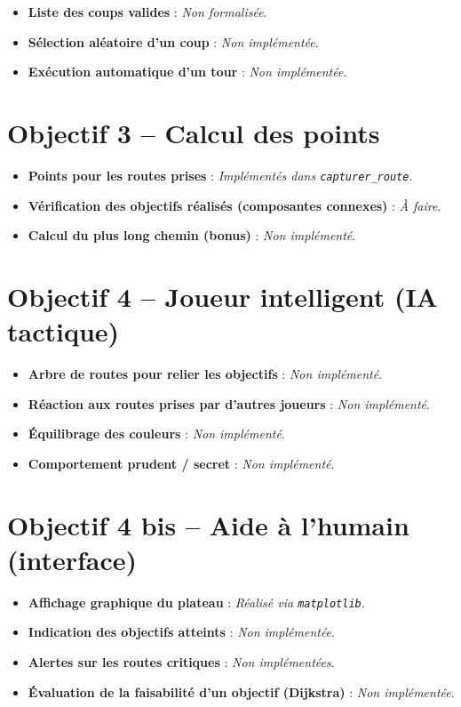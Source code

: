 \documentclass[a4paper,12pt]{report}
\begin{document}
\begin{itemize}
    \item \textbf{Liste des coups valides} : \textit{Non formalisée}.
    \item \textbf{Sélection aléatoire d’un coup} : \textit{Non implémentée}.
    \item \textbf{Exécution automatique d’un tour} : \textit{Non implémentée}.
\end{itemize}

\section*{Objectif 3 – Calcul des points}

\begin{itemize}
    \item \textbf{Points pour les routes prises} : \textit{Implémentés dans \texttt{capturer\_route}}.
    \item \textbf{Vérification des objectifs réalisés (composantes connexes)} : \textit{À faire}.
    \item \textbf{Calcul du plus long chemin (bonus)} : \textit{Non implémenté}.
\end{itemize}

\section*{Objectif 4 – Joueur intelligent (IA tactique)}

\begin{itemize}
    \item \textbf{Arbre de routes pour relier les objectifs} : \textit{Non implémenté}.
    \item \textbf{Réaction aux routes prises par d'autres joueurs} : \textit{Non implémenté}.
    \item \textbf{Équilibrage des couleurs} : \textit{Non implémenté}.
    \item \textbf{Comportement prudent / secret} : \textit{Non implémenté}.
\end{itemize}

\section*{Objectif 4 bis – Aide à l'humain (interface)}

\begin{itemize}
    \item \textbf{Affichage graphique du plateau} : \textit{Réalisé via \texttt{matplotlib}}.
    \item \textbf{Indication des objectifs atteints} : \textit{Non implémentée}.
    \item \textbf{Alertes sur les routes critiques} : \textit{Non implémentées}.
    \item \textbf{Évaluation de la faisabilité d’un objectif (Dijkstra)} : \textit{Non implémentée}.
\end{itemize}
\end{document}
